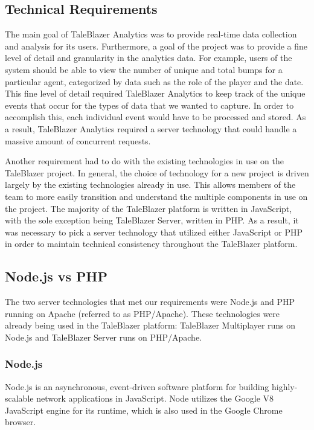 \subsection{Technical Requirements}

The main goal of TaleBlazer Analytics was to provide real-time data collection and analysis for its users. Furthermore, a goal of the project was to provide a fine level of detail and granularity in the analytics data. For example, users of the system should be able to view the number of unique and total bumps for a particular agent, categorized by data such as the role of the player and the date. This fine level of detail required TaleBlazer Analytics to keep track of the unique events that occur for the types of data that we wanted to capture. In order to accomplish this, each individual event would have to be processed and stored. As a result, TaleBlazer Analytics required a server technology that could handle a massive amount of concurrent requests. 	

Another requirement had to do with the existing technologies in use on the TaleBlazer project. In general, the choice of technology for a new project is driven largely by the existing technologies already in use. This allows members of the team to more easily transition and understand the multiple components in use on the project. The majority of the TaleBlazer platform is written in JavaScript, with the sole exception being TaleBlazer Server, written in PHP. As a result, it was necessary to pick a server technology that utilized either JavaScript or PHP in order to maintain technical consistency throughout the TaleBlazer platform. 

\subsection{Node.js vs PHP}
The two server technologies that met our requirements were Node.js and PHP running on Apache (referred to as PHP/Apache). These technologies were already being used in the TaleBlazer platform: TaleBlazer Multiplayer runs on Node.js and TaleBlazer Server runs on PHP/Apache. 

\subsubsection{Node.js}

Node.js is an asynchronous, event-driven software platform for building highly-scalable network applications in JavaScript. Node utilizes the Google V8 JavaScript engine for its runtime, which is also used in the Google Chrome browser. 

